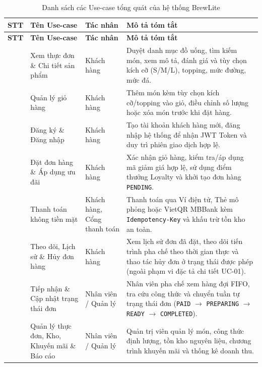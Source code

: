 \documentclass[12pt,a4paper]{report}
\begin{document}
\begin{longtable}{>{\raggedright\arraybackslash}p{1.4cm}>{\raggedright\arraybackslash}p{4.3cm}>{\raggedright\arraybackslash}p{3.1cm}>{\raggedright\arraybackslash}p{6.2cm}}
\caption{Danh sách các Use-case tổng quát của hệ thống BrewLite}\label{tab:uc-list}\\
\hline
\rowcolor{gray!20} \textbf{STT} & \textbf{Tên Use-case} & \textbf{Tác nhân} & \textbf{Mô tả tóm tắt} \\
\hline
\endfirsthead
\hline
\rowcolor{gray!20} \textbf{STT} & \textbf{Tên Use-case} & \textbf{Tác nhân} & \textbf{Mô tả tóm tắt} \\
\hline
\endhead
1 & Xem thực đơn \& Chi tiết sản phẩm & Khách hàng & Duyệt danh mục đồ uống, tìm kiếm món, xem mô tả, đánh giá và tùy chọn kích cỡ (S/M/L), topping, mức đường, mức đá. \\
\hline
2 & Quản lý giỏ hàng & Khách hàng & Thêm món kèm tùy chọn kích cỡ/topping vào giỏ, điều chỉnh số lượng hoặc xóa món trước khi đặt hàng. \\
\hline
3 & Đăng ký \& Đăng nhập & Khách hàng & Tạo tài khoản khách hàng mới, đăng nhập hệ thống để nhận JWT Token và duy trì phiên giao dịch hợp lệ. \\
\hline
4 & Đặt đơn hàng \& Áp dụng ưu đãi & Khách hàng & Xác nhận giỏ hàng, kiểm tra/áp dụng mã giảm giá hợp lệ, sử dụng điểm thưởng Loyalty và khởi tạo đơn hàng \texttt{PENDING}. \\
\hline
5 & Thanh toán không tiền mặt & Khách hàng, Cổng thanh toán & Thanh toán qua Ví điện tử, Thẻ mô phỏng hoặc VietQR MBBank kèm \texttt{Idempotency-Key} và khấu trừ tồn kho an toàn. \\
\hline
6 & Theo dõi, Lịch sử \& Hủy đơn hàng & Khách hàng & Xem lịch sử đơn đã đặt, theo dõi tiến trình pha chế theo thời gian thực và thao tác hủy đơn ở trạng thái được phép (ngoài phạm vi đặc tả chi tiết UC-01). \\
\hline
7 & Tiếp nhận \& Cập nhật trạng thái đơn & Nhân viên / Quản lý & Nhân viên pha chế xem hàng đợi FIFO, tra cứu công thức và chuyển tuần tự trạng thái đơn (\texttt{PAID} $\rightarrow$ \texttt{PREPARING} $\rightarrow$ \texttt{READY} $\rightarrow$ \texttt{COMPLETED}). \\
\hline
8 & Quản lý thực đơn, Kho, Khuyến mãi \& Báo cáo & Nhân viên / Quản lý & Quản trị viên quản lý món, công thức định lượng, tồn kho nguyên liệu, chương trình khuyến mãi và thống kê doanh thu. \\
\hline
\end{longtable}
\end{document}
